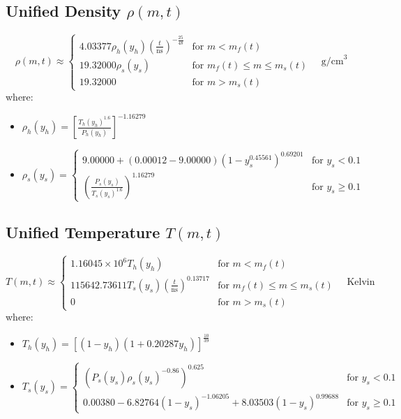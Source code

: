 \documentclass[11pt]{article}
\begin{document}
\subsection{Unified Density $\rho(m,t)$}
\begin{equation}
\boxed{
    \rho(m,t) \approx \begin{cases}
        4.03377 \rho_h(y_h) \left(\frac{t}{\text{ns}}\right)^{-\frac{25}{48}} & \text{for } m < m_f(t) \\
        19.32000 \rho_s(y_s) & \text{for } m_f(t) \le m \le m_s(t) \\
        19.32000 & \text{for } m > m_s(t)
    \end{cases} \quad \text{g/cm}^3
}
\end{equation}
where:
\begin{itemize}
    \item $\rho_h(y_h) = \left[ \frac{T_h(y_h)^{1.6}}{P_h(y_h)} \right]^{-1.16279}$ 
    \item $\rho_s(y_s) = \begin{cases}
        9.00000 + (0.00012 - 9.00000) (1 - y_s^{0.45561})^{0.69201} & \text{for } y_s < 0.1 \\
        \left( \frac{P_s(y_s)}{T_s(y_s)^{1.6}} \right)^{1.16279} & \text{for } y_s \ge 0.1
    \end{cases}$ 
\end{itemize}

\subsection{Unified Temperature $T(m,t)$}
\begin{equation}
\boxed{
    T(m,t) \approx \begin{cases}
        1.16045 \times 10^{6} T_h(y_h) & \text{for } m < m_f(t) \\
        115642.73611 T_s(y_s) \left(\frac{t}{\text{ns}}\right)^{0.13717} & \text{for } m_f(t) \le m \le m_s(t) \\
        0 & \text{for } m > m_s(t)
    \end{cases} \quad \text{Kelvin}
}
\end{equation}
where:
\begin{itemize}
    \item $T_h(y_h) = \left[ (1 - y_h)(1 + 0.20287 y_h) \right]^{\frac{10}{39}}$ 
    \item $T_s(y_s) = \begin{cases}
        \left( P_s(y_s) \rho_s(y_s)^{-0.86} \right)^{0.625} & \text{for } y_s < 0.1 \\
        0.00380 - 6.82764 (1 - y_s)^{-1.06205} + 8.03503 (1 - y_s)^{0.99688} & \text{for } y_s \ge 0.1
    \end{cases}$ 
\end{itemize}
\end{document}
